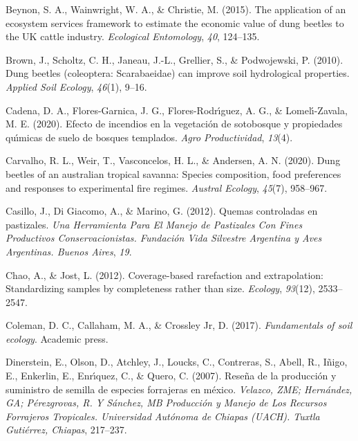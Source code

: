 \documentclass[
  11pt,
  a4paper]{book}
\newlength{\cslhangindent}
\newlength{\cslentryspacingunit} %
\newenvironment{CSLReferences}[2] %
 {%
  \setlength{\parindent}{0pt}
  \ifodd #1
  \let\oldpar\par
  \def\par{\hangindent=\cslhangindent\oldpar}
  \fi
  \setlength{\parskip}{#2\cslentryspacingunit}
 }%
 {}
\begin{document}
\begin{CSLReferences}{1}{0}
\leavevmode{}%
Beynon, S. A., Wainwright, W. A., \& Christie, M. (2015). The application of an ecosystem services framework to estimate the economic value of dung beetles to the UK cattle industry. \emph{Ecological Entomology}, \emph{40}, 124--135.

\leavevmode{}%
Brown, J., Scholtz, C. H., Janeau, J.-L., Grellier, S., \& Podwojewski, P. (2010). Dung beetles (coleoptera: Scarabaeidae) can improve soil hydrological properties. \emph{Applied Soil Ecology}, \emph{46}(1), 9--16.

\leavevmode{}%
Cadena, D. A., Flores-Garnica, J. G., Flores-Rodrı́guez, A. G., \& Lomelı́-Zavala, M. E. (2020). Efecto de incendios en la vegetaci{ó}n de sotobosque y propiedades qu{ı́}micas de suelo de bosques templados. \emph{Agro Productividad}, \emph{13}(4).

\leavevmode{}%
Carvalho, R. L., Weir, T., Vasconcelos, H. L., \& Andersen, A. N. (2020). Dung beetles of an australian tropical savanna: Species composition, food preferences and responses to experimental fire regimes. \emph{Austral Ecology}, \emph{45}(7), 958--967.

\leavevmode{}%
Casillo, J., Di Giacomo, A., \& Marino, G. (2012). Quemas controladas en pastizales. \emph{Una Herramienta Para El Manejo de Pastizales Con Fines Productivos Conservacionistas. Fundaci{ó}n Vida Silvestre Argentina y Aves Argentinas. Buenos Aires}, \emph{19}.

\leavevmode{}%
Chao, A., \& Jost, L. (2012). Coverage-based rarefaction and extrapolation: Standardizing samples by completeness rather than size. \emph{Ecology}, \emph{93}(12), 2533--2547.

\leavevmode{}%
Coleman, D. C., Callaham, M. A., \& Crossley Jr, D. (2017). \emph{Fundamentals of soil ecology}. Academic press.

\leavevmode{}%
Dinerstein, E., Olson, D., Atchley, J., Loucks, C., Contreras, S., Abell, R., Iñigo, E., Enkerlin, E., Enrı́quez, C., \& Quero, C. (2007). Rese{ñ}a de la producci{ó}n y suministro de semilla de especies forrajeras en m{é}xico. \emph{Velazco, ZME; Hern{á}ndez, GA; P{é}rezgrovas, R. Y S{á}nchez, MB Producci{ó}n y Manejo de Los Recursos Forrajeros Tropicales. Universidad Aut{ó}noma de Chiapas (UACH). Tuxtla Guti{é}rrez, Chiapas}, 217--237.


\end{CSLReferences}
\end{document}
